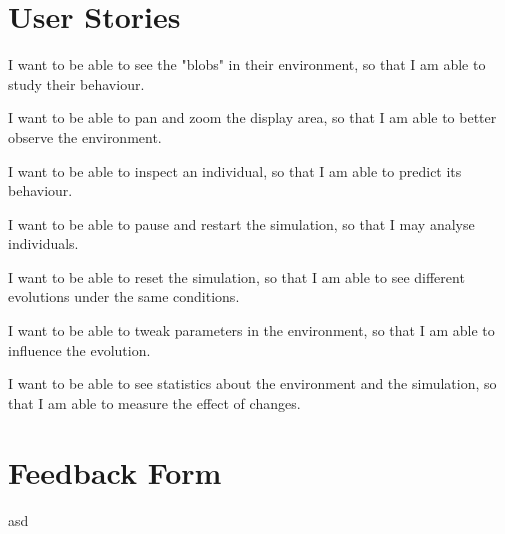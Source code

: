\chapter{User Stories}
I want to be able to see the "blobs" in their environment, so that I am able to study their behaviour.

I want to be able to pan and zoom the display area, so that I am able to better observe the environment.

I want to be able to inspect an individual, so that I am able to predict its behaviour.

I want to be able to pause and restart the simulation, so that I may analyse individuals.

I want to be able to reset the simulation, so that I am able to see different evolutions under the same conditions.

I want to be able to tweak parameters in the environment, so that I am able to influence the evolution.

I want to be able to see statistics about the environment and the simulation, so that I am able to measure the effect of changes.

\chapter{Feedback Form} \label{appendix:b}
asd